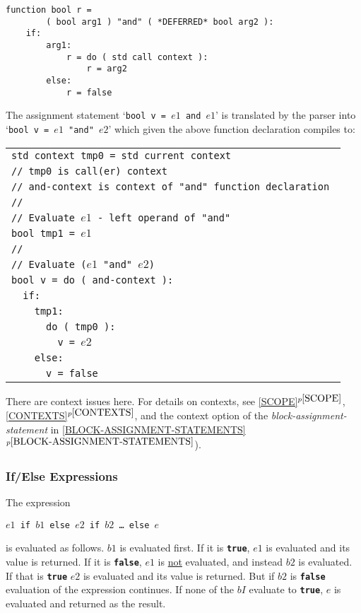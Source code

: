 \documentclass[12pt]{article}
\newcommand{\TT}[1]{{\tt \bfseries #1}}
\newcommand{\itemref}[1]{\ref{#1}$^{p\pageref{#1}}$}
\newenvironment{indpar}[1][0.3in]%
	{\begin{list}{}%
		     {\setlength{\itemsep}{0in}%
		      \setlength{\topsep}{0in}%
		      \setlength{\parsep}{1ex}%
		      \setlength{\labelwidth}{#1}%
		      \setlength{\leftmargin}{#1}%
		      \addtolength{\leftmargin}{\labelsep}}%
	 \item}%
	{\end{list}}
\begin{document}
\begin{indpar}\begin{verbatim}
function bool r =
        ( bool arg1 ) "and" ( *DEFERRED* bool arg2 ):
    if:
        arg1:
            r = do ( std call context ):
                r = arg2
        else:
            r = false
\end{verbatim}\end{indpar}

The assignment statement `{\tt bool v = $e1$ and $e1$}' is
translated by the parser into `{\tt bool v = $e1$ "and" $e2$}' which
given the above function declaration compiles to:\label{AND-EXAMPLE}
\begin{indpar}
\begin{tabular}{l}
\tt std context tmp0 = std current context \\
\tt // tmp0 is call(er) context \\
\tt // and-context is context of "and" function declaration \\
\tt // \\
\tt // Evaluate $e1$ - left operand of "and"\\
\tt bool tmp1 = $e1$ \\
\tt // \\
\tt // Evaluate ($e1$ "and" $e2$) \\
\tt bool v = do ( and-context ): \\
\tt ~~if: \\
\tt ~~~~tmp1: \\
\tt ~~~~~~do ( tmp0 ): \\
\tt ~~~~~~~~v = $e2$ \\
\tt ~~~~else: \\
\tt ~~~~~~v = false \\
\end{tabular}
\end{indpar}

There are context issues here.  For details on contexts,
see \itemref{SCOPE},
\itemref{CONTEXTS}, and the context option of the
{\em block-assignment-statement} in 
\itemref{BLOCK-ASSIGNMENT-STATEMENTS}).

\subsubsection{If/Else Expressions}

The expression
\begin{center}
\tt $e1$ if $b1$ else $e2$ if $b2$ \ldots{} else $e$
\end{center}
is evaluated as follows.
$b1$ is evaluated first.  If it is \TT{true}, $e1$ is evaluated and its
value is returned.  If it is \TT{false}, $e1$ is \underline{not}
evaluated, and instead $b2$ is evaluated.  If that is \TT{true}
$e2$ is evaluated and its value is returned.  But if $b2$ is \TT{false}
evaluation of the expression continues.  If none of
the $bI$ evaluate to \TT{true}, $e$ is evaluated and returned as the result.
\end{document}
